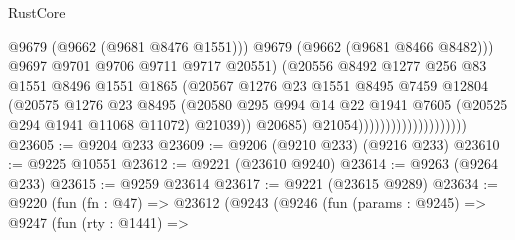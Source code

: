 \begin{lexlean}{RustCore}
\begin{coremodule}
                                                @9679
                                                (@9662 (@9681 @8476 @1551)))
                                              @9679
                                              (@9662 (@9681 @8466 @8482)))
                                            @9697
                                            @9701
                                            @9706
                                            @9711
                                            @9717
                                            @20551)
                                          (@20556
                                            @8492
                                            @1277
                                            @256
                                            @83
                                            @1551
                                            @8496
                                            @1551
                                            @1865
                                            (@20567
                                              @1276
                                              @23
                                              @1551
                                              @8495
                                              @7459
                                              @12804
                                              (@20575
                                                @1276
                                                @23
                                                @8495
                                                (@20580
                                                  @295
                                                  @994
                                                  @14
                                                  @22
                                                  @1941
                                                  @7605
                                                  (@20525 @294 @1941 @11068 @11072)
                                                  @21039))
                                              @20685)
                                            @21054))))))))))))))))))))
@23605 := @9204 @233
@23609 := @9206 (@9210 @233) (@9216 @233)
@23610 := @9225 @10551
@23612 := @9221 (@23610 @9240)
@23614 := @9263 (@9264 @233)
@23615 := @9259 @23614
@23617 := @9221 (@23615 @9289)
@23634 := @9220
    (fun (fn : @47) =>
    @23612
      (@9243
        (@9246
          (fun (params : @9245) =>
          @9247
            (fun (rty : @1441) =>

\end{coremodule}
\end{lexlean}
